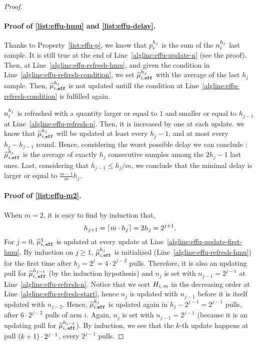 \begin{proof}
\paragraph{Proof of \ref{list:effu-hmu} and \ref{list:effu-delay}.}
Thanks to Property~\ref{list:effu-p}, we know that $p_i^{h_j}$ is the sum of the $n_i^{h_j}$ last sample. It is still true at the end of Line~\ref{algline:effu-update-n} (see the proof). Then, at Line~\ref{algline:effu-refresh-hmu}, and given the condition in Line~\ref{algline:effu-refresh-condition}, we set $\widehat{\mu}_{i,\texttt{eff}}^{h_j}$ with the average of the last $h_j$ sample. Then, $\widehat{\mu}_{i,\texttt{eff}}^{h_j}$ is not updated untill the condition at Line~\ref{algline:effu-refresh-condition} is fulfilled again. 

$n_i^{h_j}$ is refreshed with a quantity larger or equal to $1$ and smaller or equal to $h_{j-1}$ at Line~\ref{algline:effu-refresh-n}. Then, it is increased by one at each update. we know that $\widehat{\mu}_{i,\texttt{eff}}^{h_j}$ will be updated at least every $h_j-1$, and at most every $h_j -h_{j-1}$ round. Hence, considering the worst possible delay we can conclude : $\widehat{\mu}_{i,\texttt{eff}}^{h_j}$ is the average of exactly $h_j$ consecutive samples among the $2h_j -1$ last ones. Last, considering that $h_{j-1}\leq h_j /m$, we conclude that the minimal delay is larger or equal to $\frac{m-1}{m}h_j$.

\paragraph{Proof of \ref{list:effu-m2}.}
When $m=2$, it is easy to find by induction that,
 \[
 h_{j+1} = \left\lceil m\cdot h_j\right\rceil = 2h_j = 2^{j+1}.
 \]
For $j=0$, $\widehat{\mu}_{i,\,\texttt{eff}}^1$ is updated at every update at Line~\ref{algline:effu-update-first-hmu}.
By induction on $j\geq 1$, $\widehat{\mu}_{i,\texttt{eff}}^{h_j}$ is initialized (Line~\ref{algline:effu-refresh-hmu}) for the first time after $h_j= 2^{j} = 4 \cdot 2^{j-2}$ pulls. Therefore, it is also an updating pull for $\widehat{\mu}_{i,\,\texttt{eff}}^{h_{j-1}}$ (by the induction hypothesis) and $n_j$ is set with $n_{j-1} = 2^{j-1}$ at Line~\ref{algline:effu-refresh-n}. Notice that we sort $H_{i,\,m}$ in the decreasing order at Line~\ref{algline:effu-refresh-start}, hence $n_j$ is updated with $n_{j-1}$ before it is itself updated with $n_{j-2}$.  Hence, $\widehat{\mu}_{i,\texttt{eff}}^{h_j}$ is updated again in $h_j - 2^{j-1} = 2^{j-1}$ pulls, \ie after $6 \cdot 2^{j-2}$ pulls of arm $i$. Again, $n_j$ is set with $n_{j-1} = 2^{j-1}$ (because it is an updating pull for $\widehat{\mu}_{i,\,\texttt{eff}}^{h_{j-1}}$). By induction, we see that the $k$-th update happens at pull $ \left(k+1\right) \cdot 2^{j-1}$, \ie every $2^{j-1}$ pulls.


\end{proof}

